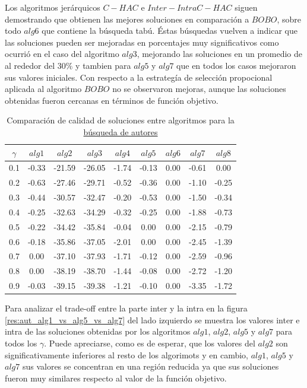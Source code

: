 Los algoritmos jerárquicos $C-HAC$ e $Inter-Intra C-HAC$ siguen demostrando que obtienen las mejores soluciones en comparación a $BOBO$, sobre todo $alg6$ que contiene la búsqueda tabú. Éstas búsquedas vuelven a indicar que las soluciones pueden ser mejoradas en porcentajes muy significativos como ocurrió en el caso del algoritmo $alg3$, mejorando las soluciones en un promedio de al rededor del $30\%$ y tambien para $alg5$ y $alg7$ que en todos los casos mejoraron sus valores iniciales. Con respecto a la estrategía de selección propocional aplicada al algoritmo $BOBO$ no se observaron mejoras, aunque las soluciones obtenidas fueron cercanas en términos de función objetivo. 

\begin{table}[H]
\begin{center}
\begin{tabular}{|c|c|c|c|c|c|c|c|c|}
\hline
$\gamma$&$alg1$&$alg2$&$alg3$&$alg4$&$alg5$&$alg6$&$alg7$&$alg8$ \\ \hline
0.1 & -0.33 & -21.59 & -26.05 & -1.74 & -0.13 & 0.00 & -0.61 & 0.00 \\
0.2 & -0.63 & -27.46 & -29.71 & -0.52 & -0.36 & 0.00 & -1.10 & -0.25 \\
0.3 & -0.44 & -30.57 & -32.47 & -0.20 & -0.53 & 0.00 & -1.50 & -0.34 \\
0.4 & -0.25 & -32.63 & -34.29 & -0.32 & -0.25 & 0.00 & -1.88 & -0.73 \\
0.5 & -0.22 & -34.42 & -35.84 & -0.04 & 0.00 & 0.00 & -2.15 & -0.79 \\
0.6 & -0.18 & -35.86 & -37.05 & -2.01 & 0.00 & 0.00 & -2.45 & -1.39 \\
0.7 & 0.00 & -37.10 & -37.93 & -1.71 & -0.12 & 0.00 & -2.59 & -0.96 \\ 
0.8 & 0.00 & -38.19 & -38.70 & -1.44 & -0.08 & 0.00 & -2.72 & -1.20 \\
0.9 & -0.03 & -39.15 & -39.38 & -1.21 & -0.10 & 0.00 & -3.35 & -1.72 \\ \hline 
\end{tabular}
\caption{Comparación de calidad de soluciones entre algoritmos para la \hyperref[busqueda:autores]{búsqueda de autores}} 
\label{tabla:comp2}
\end{center}
\end{table}

Para analizar el trade-off entre la parte inter y la intra en la figura \ref{res:aut_alg1_vs_alg5_vs_alg7} del lado izquierdo se muestra los valores inter e intra de las soluciones obtenidas por los algoritmos $alg1$, $alg2$, $alg5$ y $alg7$ para todos los $\gamma$. Puede apreciarse, como es de esperar, que los valores del $alg2$ son significativamente inferiores al resto de los algorimots y en cambio, $alg1$, $alg5$ y $alg7$ sus valores se concentran en una región reducida ya que sus soluciones fueron muy similares respecto al valor de la función objetivo.

